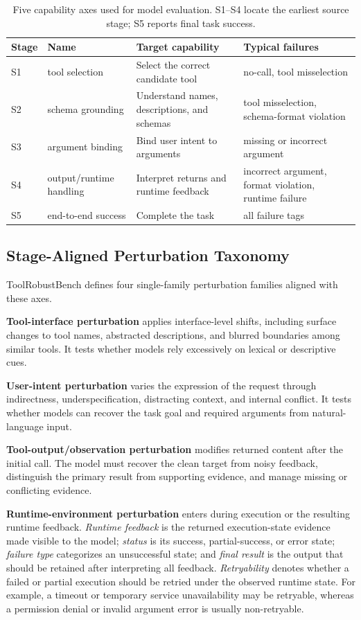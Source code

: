 \documentclass[11pt]{article}
\newcommand{\ToolRobustBench}{ToolRobustBench\xspace}
\begin{document}
\begin{table}[t]
\centering
\small
\begin{tabularx}{\linewidth}{l l Y Y}
\toprule
Stage & Name & Target capability & Typical failures \\
\midrule
S1 & tool selection & Select the correct candidate tool & no-call, tool misselection \\
S2 & schema grounding & Understand names, descriptions, and schemas & tool misselection, schema-format violation \\
S3 & argument binding & Bind user intent to arguments & missing or incorrect argument \\
S4 & output/runtime handling & Interpret returns and runtime feedback & incorrect argument, format violation, runtime failure \\
S5 & end-to-end success & Complete the task & all failure tags \\
\bottomrule
\end{tabularx}
\caption{Five capability axes used for model evaluation. S1--S4 locate the earliest source stage; S5 reports final task success.}
\label{tab:stages}
\end{table}

\subsection{Stage-Aligned Perturbation Taxonomy}
\label{sec:taxonomy}

\ToolRobustBench{} defines four single-family perturbation families aligned with these axes.

\textbf{Tool-interface perturbation} applies interface-level shifts, including surface changes to tool names, abstracted descriptions, and blurred boundaries among similar tools. It tests whether models rely excessively on lexical or descriptive cues.

\textbf{User-intent perturbation} varies the expression of the request through indirectness, underspecification, distracting context, and internal conflict. It tests whether models can recover the task goal and required arguments from natural-language input.

\textbf{Tool-output/observation perturbation} modifies returned content after the initial call. The model must recover the clean target from noisy feedback, distinguish the primary result from supporting evidence, and manage missing or conflicting evidence.

\textbf{Runtime-environment perturbation} enters during execution or the resulting runtime feedback. \emph{Runtime feedback} is the returned execution-state evidence made visible to the model; \emph{status} is its success, partial-success, or error state; \emph{failure type} categorizes an unsuccessful state; and \emph{final result} is the output that should be retained after interpreting all feedback. \emph{Retryability} denotes whether a failed or partial execution should be retried under the observed runtime state. For example, a timeout or temporary service unavailability may be retryable, whereas a permission denial or invalid argument error is usually non-retryable.
\end{document}
